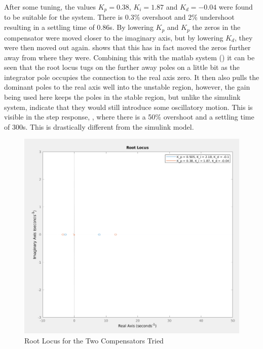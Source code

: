 \documentclass[a4paper, 11pt, compsoc]{IEEEtran}
\begin{document}
				\par
				After some tuning, the values $K_p = 0.38$, $K_i = 1.87$ and $K_d = -0.04$ were found to be suitable for the system. There is 0.3\% overshoot and 2\% undershoot resulting in a settling time of 0.86s. By lowering $K_p$ and $K_p$ the zeros in the compensator were moved closer to the imaginary axis, but by lowering $K_d$, they were then moved out again.  shows that this has in fact moved the zeros further away from where they were. Combining this with the matlab system () it can be seen that the root locus tugs on the further away poles on a little bit as the integrator pole occupies the connection to the real axis zero. It then also pulls the dominant poles to the real axis well into the unstable region, however, the gain being used here keeps the poles in the stable region, but unlike the simulink system, indicate that they would still introduce some oscillatory motion. This is visible in the step response, , where there is a 50\% overshoot and a settling time of 300s. This is drastically different from the simulink model.

				\begin{figure}[!ht]
					\centering
					\includegraphics[width=\columnwidth]{lab6pidrl.png}
					\caption{Root Locus for the Two Compensators Tried}
					\label{fig:lab6pidrl}
				\end{figure}
\end{document}
